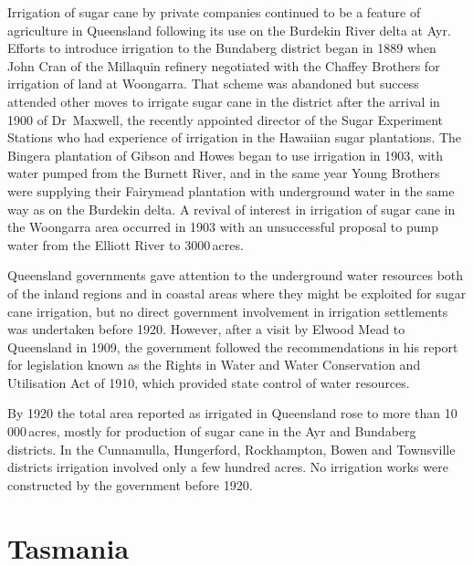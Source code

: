 Irrigation of sugar cane  by private companies
continued to be a feature of agriculture in Queensland following its
use on the Burdekin River  delta at
Ayr.  Efforts to introduce irrigation to the Bundaberg
 district began in 1889 when John Cran
 of the Millaquin refinery negotiated with the Chaffey
Brothers for irrigation of land at Woongarra. That scheme was
abandoned but success attended other moves to irrigate sugar cane in
the district after the arrival in 1900 of Dr~Maxwell, the recently
appointed director of the Sugar Experiment Stations who had experience
of irrigation in the Hawaiian sugar plantations.  The Bingera
plantation of Gibson and Howes began to use irrigation in 1903, with
water pumped from the Burnett River,
 and in the same year Young Brothers were
supplying their Fairymead plantation with underground water in the
same way as on the Burdekin delta.  A revival of interest in
irrigation of sugar cane in the Woongarra area occurred in 1903 with
an unsuccessful proposal to pump water from the Elliott River to
3000\,acres.

Queensland governments gave attention to the underground water
resour\-ces both of the inland regions and in coastal areas where they
might be exploited for sugar cane irrigation, but no direct government
involvement in irrigation settlements was undertaken before 1920.
However, after a visit by Elwood Mead  to Queensland
in 1909, the government followed the recommendations in his report for
legislation known as the Rights in Water and Water Conservation and
Utilisation Act of 1910, which provided state control of water
resources.

By 1920 the total area reported as irrigated in Queensland rose to
more than 10\,000\,acres, mostly for production of sugar cane in the
Ayr and Bundaberg districts.  In the Cunnamulla, Hungerford,
Rockhampton, Bowen and Townsville districts irrigation involved only a
few hundred acres.  No irrigation works were constructed by the
government before 1920.

\section*{Tasmania}

